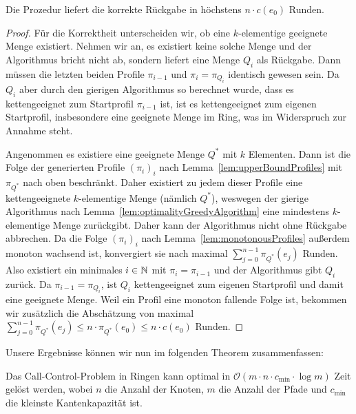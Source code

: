 \begin{lemma}\label{lem:decisionProcedure}
    Die Prozedur liefert die korrekte Rückgabe in höchstens $n\cdot c(e_0)$ Runden.
\end{lemma}
\begin{proof}
    Für die Korrektheit unterscheiden wir, ob eine $k$-elementige geeignete Menge existiert.
    Nehmen wir an, es existiert keine solche Menge und der Algorithmus bricht nicht ab, sondern liefert eine Menge $Q_i$
    als Rückgabe.
    Dann müssen die letzten beiden Profile $\pi_{i-1}$ und $\pi_{i} = \pi_{Q_i}$ identisch gewesen sein.
    Da $Q_i$ aber durch den gierigen Algorithmus so berechnet wurde, dass es kettengeeignet zum Startprofil
    $\pi_{i-1}$ ist, ist es kettengeeignet zum eigenen Startprofil, insbesondere eine geeignete Menge im Ring, was im
    Widerspruch zur Annahme steht.

    Angenommen es existiere eine geeignete Menge $Q^*$ mit $k$ Elementen.
    Dann ist die Folge der generierten Profile $(\pi_i)_{i}$ nach Lemma~\ref{lem:upperBoundProfiles} mit $\pi_{Q^*}$
    nach oben beschränkt.
    Daher existiert zu jedem dieser Profile eine kettengeeignete $k$-elementige Menge (nämlich $Q^*$),
    weswegen der gierige Algorithmus nach Lemma~\ref{lem:optimalityGreedyAlgorithm} eine mindestens $k$-elementige Menge zurückgibt.
    Daher kann der Algorithmus nicht ohne Rückgabe abbrechen.
    Da die Folge $(\pi_i)_i$ nach Lemma~\ref{lem:monotonousProfiles} außerdem monoton wachsend ist, konvergiert sie nach
    maximal $\sum_{j=0}^{n-1}\pi_{Q^*}(e_j)$ Runden.
    Also existiert ein minimales $i\in \mathbb N$ mit $\pi_i = \pi_{i-1}$ und der Algorithmus gibt $Q_i$ zurück.
    Da $\pi_{i-1} = \pi_{Q_{i}}$, ist $Q_i$ kettengeeignet zum eigenen Startprofil und damit eine geeignete Menge.
    Weil ein Profil eine monoton fallende Folge ist, bekommen wir zusätzlich die Abschätzung von maximal
    $\sum_{j=0}^{n-1}\pi_{Q^*}(e_j) \leq n \cdot \pi_{Q^*}(e_0) \leq n \cdot c(e_0)$ Runden.
\end{proof}
Unsere Ergebnisse können wir nun im folgenden Theorem zusammenfassen:
\begin{theorem}
    Das Call-Control-Problem in Ringen kann optimal in $\mathcal O(m \cdot n \cdot c_{\min} \cdot \log m)$ Zeit gelöst werden,
    wobei $n$ die Anzahl der Knoten, $m$ die Anzahl der Pfade und $c_{\min}$ die kleinste Kantenkapazität ist.
\end{theorem}
